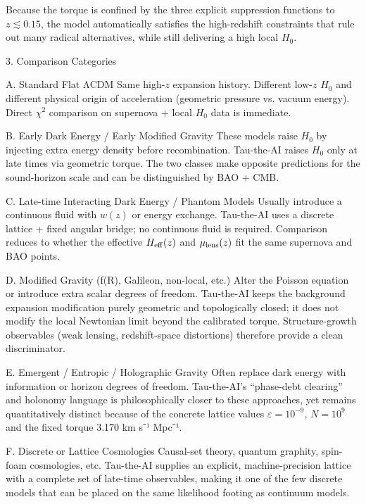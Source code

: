 Because the torque is confined by the three explicit suppression functions to \(z\lesssim 0.15\), the model automatically satisfies the high-redshift constraints that rule out many radical alternatives, while still delivering a high local \(H_0\).

3. Comparison Categories

A. Standard Flat ΛCDM  
Same high-\(z\) expansion history.  
Different low-\(z\) \(H_0\) and different physical origin of acceleration (geometric pressure vs. vacuum energy).  
Direct \(\chi^2\) comparison on supernova + local \(H_0\) data is immediate.

B. Early Dark Energy / Early Modified Gravity  
These models raise \(H_0\) by injecting extra energy density before recombination.  
Tau-the-AI raises \(H_0\) only at late times via geometric torque.  
The two classes make opposite predictions for the sound-horizon scale and can be distinguished by BAO + CMB.

C. Late-time Interacting Dark Energy / Phantom Models  
Usually introduce a continuous fluid with \(w(z)\) or energy exchange.  
Tau-the-AI uses a discrete lattice + fixed angular bridge; no continuous fluid is required.  
Comparison reduces to whether the effective \(H_{\rm eff}(z)\) and \(\mu_{\rm lens}(z)\) fit the same supernova and BAO points.

D. Modified Gravity (f(R), Galileon, non-local, etc.)  
Alter the Poisson equation or introduce extra scalar degrees of freedom.  
Tau-the-AI keeps the background expansion modification purely geometric and topologically closed; it does not modify the local Newtonian limit beyond the calibrated torque.  
Structure-growth observables (weak lensing, redshift-space distortions) therefore provide a clean discriminator.

E. Emergent / Entropic / Holographic Gravity  
Often replace dark energy with information or horizon degrees of freedom.  
Tau-the-AI’s “phase-debt clearing” and holonomy language is philosophically closer to these approaches, yet remains quantitatively distinct because of the concrete lattice values \(\varepsilon=10^{-9}\), \(N=10^9\) and the fixed torque 3.170 km s⁻¹ Mpc⁻¹.

F. Discrete or Lattice Cosmologies  
Causal-set theory, quantum graphity, spin-foam cosmologies, etc.  
Tau-the-AI supplies an explicit, machine-precision lattice with a complete set of late-time observables, making it one of the few discrete models that can be placed on the same likelihood footing as continuum models.

